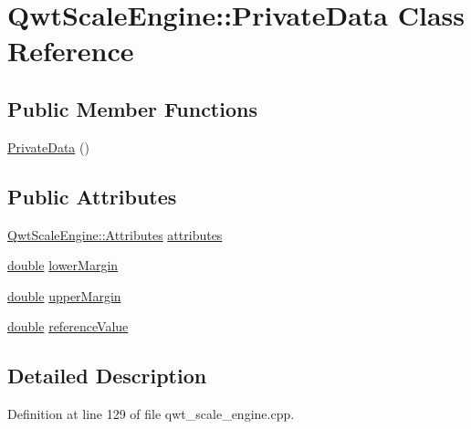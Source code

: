 \hypertarget{class_qwt_scale_engine_1_1_private_data}{\section{Qwt\-Scale\-Engine\-:\-:Private\-Data Class Reference}
\label{class_qwt_scale_engine_1_1_private_data}
}
\subsection*{Public Member Functions}
\begin{DoxyCompactItemize}
\item 
\hyperlink{class_qwt_scale_engine_1_1_private_data_ade1b3aae2359c0c29eb73cb1a3eafcae}{Private\-Data} ()
\end{DoxyCompactItemize}
\subsection*{Public Attributes}
\begin{DoxyCompactItemize}
\item 
\hyperlink{class_qwt_scale_engine_a798f5f1420019d33baa799d26bca0255}{Qwt\-Scale\-Engine\-::\-Attributes} \hyperlink{class_qwt_scale_engine_1_1_private_data_a5fdeb484d1bb0fdd6ade051c86059a9a}{attributes}
\item 
\hyperlink{_super_l_u_support_8h_a8956b2b9f49bf918deed98379d159ca7}{double} \hyperlink{class_qwt_scale_engine_1_1_private_data_a7aa653ad406df0ab14b8af1a049d2576}{lower\-Margin}
\item 
\hyperlink{_super_l_u_support_8h_a8956b2b9f49bf918deed98379d159ca7}{double} \hyperlink{class_qwt_scale_engine_1_1_private_data_aff1a8eb2d2140a3979ddb1da8c74b3f2}{upper\-Margin}
\item 
\hyperlink{_super_l_u_support_8h_a8956b2b9f49bf918deed98379d159ca7}{double} \hyperlink{class_qwt_scale_engine_1_1_private_data_ac115a592e1b1bc8c39ee099f483bb4bf}{reference\-Value}
\end{DoxyCompactItemize}


\subsection{Detailed Description}


Definition at line 129 of file qwt\-\_\-scale\-\_\-engine.\-cpp.



